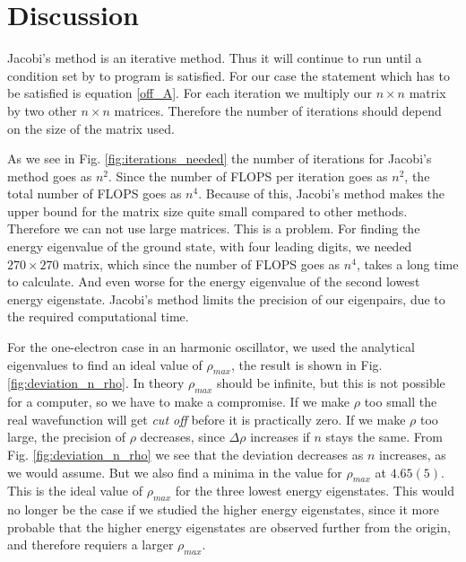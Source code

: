 \documentclass[%
 reprint,
nofootinbib,
aps,
]{revtex4-1}
\begin{document}
\section{Discussion}

Jacobi's method is an iterative method. Thus it will continue to run until a condition set by to program is satisfied. For our case the statement which has to be satisfied is equation \eqref{off_A}. For each iteration we multiply our $n\times n$ matrix by two other $n\times n$ matrices. Therefore the number of iterations should depend on the size of the matrix used.%

 As we see in Fig. \vref{fig:iterations_needed} the number of iterations for  Jacobi's method goes as $n^2$. Since the number of FLOPS per iteration goes as $n^2$, the total number of FLOPS goes as $n^4$. Because of this, Jacobi's method makes the upper bound for the matrix size quite small compared to other methods. Therefore we can not use large matrices. This is a problem. For finding the energy eigenvalue of the ground state, with four leading digits, we needed $270\times 270$ matrix, which since the number of FLOPS goes as $n^4$, takes a long time to calculate. And even worse for the energy eigenvalue of the second lowest energy eigenstate. Jacobi's method limits the precision of our eigenpairs, due to the required computational time.\par

For the one-electron case in an harmonic oscillator, we used the analytical eigenvalues to find an ideal value of $\rho_{max}$, the result is shown in Fig. \vref{fig:deviation_n_rho}. In theory $\rho_{max}$ should be infinite, but this is not possible for a computer, so we have to make a compromise. If we make $\rho$ too small the real wavefunction will get \textit{cut off} before it is practically zero. If we make $\rho$ too large, the precision of $\rho$ decreases, since $\Delta \rho$ increases if $n$ stays the same.
From Fig. \vref{fig:deviation_n_rho} we see that the deviation decreases as $n$ increases, as we would assume. But we also find a minima in the value for $\rho_{max}$ at $4.65(5)$. This is the ideal value of $\rho_{max}$ for the three lowest energy eigenstates. This would no longer be the case if we studied the higher energy eigenstates, since it more probable that the higher energy eigenstates are observed further from the origin, and therefore requiers a larger $\rho_{max}$.
\end{document}
